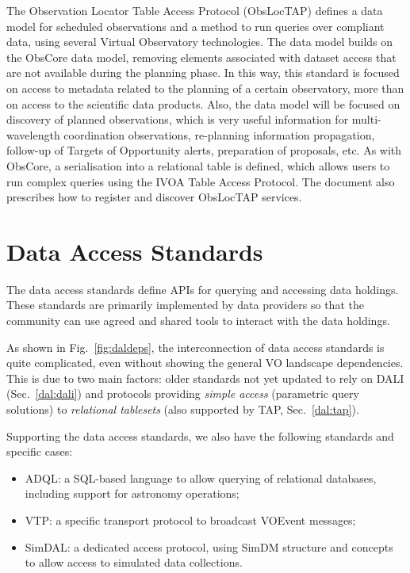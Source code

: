\documentclass[11pt,letter]{ivoa}
\begin{document}
The Observation Locator Table Access Protocol (ObsLocTAP) \citep{2021ivoa.spec.0724S} 
defines a data model for scheduled observations 
and a method to run queries over compliant data, using several Virtual Observatory technologies.
The data model builds on the ObsCore data model, removing elements associated with dataset 
access that are not available during the planning phase. In this way, this standard is focused 
on access to metadata related to the planning of a certain observatory, more than on access to 
the scientific data products. Also, the data model will be focused on discovery of planned 
observations, which is very useful information for multi-wavelength coordination observations, 
re-planning information propagation, follow-up of Targets of Opportunity alerts, preparation 
of proposals, etc. As with ObsCore, a serialisation into a relational table is defined, which 
allows users to run complex queries using the IVOA Table Access Protocol. The document also 
prescribes how to register and discover ObsLocTAP services. 

\section{Data Access Standards}
\label{dal}

The data access standards define APIs for querying and accessing data holdings.
These standards are primarily implemented by data providers so that the community 
can use agreed and shared tools to interact with the data holdings.

As shown in Fig.~\ref{fig:daldeps}, the interconnection of data
access standards is quite complicated, even without showing the general VO landscape 
dependencies. This is due to two main
factors: older standards not yet updated to rely on DALI (Sec.~\ref{dal:dali})
and protocols providing \textit{simple access} (parametric query solutions) to
\textit{relational tablesets} (also supported by TAP, Sec.~\ref{dal:tap}).

Supporting the data access standards, we also have the following standards and specific cases:
\begin{itemize}
	\item ADQL: a SQL-based language to allow querying of relational databases, including support for astronomy operations;
	\item VTP: a specific transport protocol to broadcast VOEvent
messages;
	\item SimDAL: a dedicated access protocol, using SimDM structure and
concepts to allow access to simulated data collections.
\end{itemize}
\end{document}
